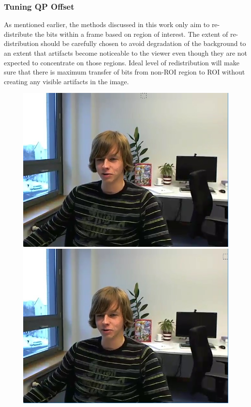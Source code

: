 \documentclass[11pt]{article} %
\begin{document}
\subsubsection{Tuning QP Offset}
As mentioned earlier, the methods discussed in this work only aim to re-distribute the bits within a frame based on region of interest. The extent of re-distribution should be carefully chosen to avoid degradation of the background to an extent that artifacts become noticeable to the viewer even though they are not expected to concentrate on those regions. Ideal level of redistribution will make sure that there is maximum transfer of bits from non-ROI region to ROI without creating any visible artifacts in the image.
\begin{figure}[!h]
    \centering
    \includegraphics[scale=0.43]{QPOffset/trialOffset/Paul250kbps_offset2}
    \includegraphics[scale=0.43]{QPOffset/trialOffset/Paul250kbps_offset4}

\end{figure}
\end{document}
